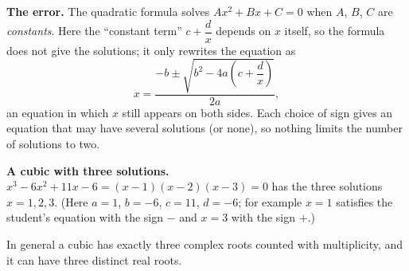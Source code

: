 \textbf{The error.} The quadratic formula solves $Ax^2+Bx+C=0$ when $A$, $B$, $C$ are \emph{constants}. Here the ``constant term'' $c+\dfrac{d}{x}$ depends on $x$ itself, so the formula does not give the solutions; it only rewrites the equation as
\[
x=\dfrac{-b\pm\sqrt{b^2-4a\left(c+\dfrac{d}{x}\right)}}{2a},
\]
an equation in which $x$ still appears on both sides. Each choice of sign gives an equation that may have several solutions (or none), so nothing limits the number of solutions to two.

\textbf{A cubic with three solutions.} $x^3-6x^2+11x-6=(x-1)(x-2)(x-3)=0$ has the three solutions $x=1,2,3$. (Here $a=1$, $b=-6$, $c=11$, $d=-6$; for example $x=1$ satisfies the student's equation with the sign $-$ and $x=3$ with the sign $+$.)

In general a cubic has exactly three complex roots counted with multiplicity, and it can have three distinct real roots.
